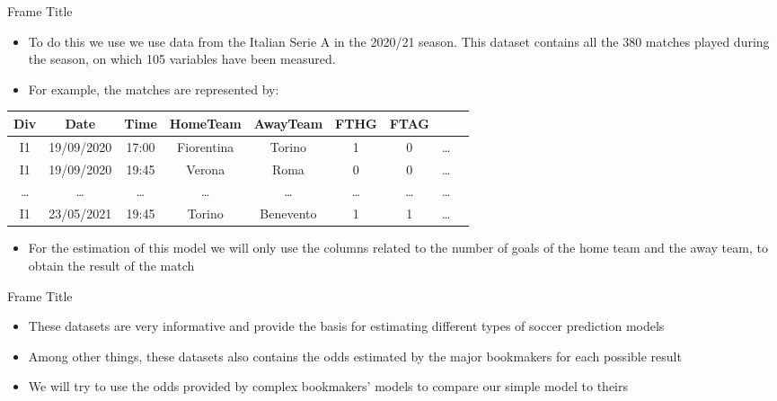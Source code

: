 \documentclass[aspectratio=169,xcolor=dvipsnames]{beamer}
\begin{document}

\begin{frame}{Frame Title}
\begin{itemize}

    \item To do this we use we use data from the Italian Serie A in the 2020/21 season. This dataset contains all the 380 matches played during the season, on which 105 variables have been measured. 
    
    \item For example, the matches are represented by:
\end{itemize}

    \begin{table}[ht]
    \centering
    \begin{tabular}{ccccccccc}
      \hline
      Div & Date & Time & HomeTeam & AwayTeam & FTHG & FTAG & \\ 
      \hline
      I1 & 19/09/2020 & 17:00 & Fiorentina & Torino &   1 &  0 & \dots \\ 
      I1 & 19/09/2020 & 19:45 & Verona & Roma &   0 &   0 & \dots \\ 
      \dots & \dots & \dots  & \dots & \dots & \dots & \dots & \dots \\ 
      I1 & 23/05/2021 & 19:45 & Torino & Benevento &   1 &   1 & \dots \\ 
       \hline
    \end{tabular}
    \end{table}

\begin{itemize}
    
    \item For the estimation of this model we will only use the columns related to the number of goals of the home team and the away team, to obtain the result of the match
\end{itemize}
    
\end{frame}

\begin{frame}{Frame Title}
\begin{itemize}

    \item These datasets are very informative and provide the basis for estimating different types of soccer prediction models
    
    \item Among other things, these datasets also contains the odds estimated by the major bookmakers for each possible result
    
    \item We will try to use the odds provided by complex bookmakers' models to compare our simple model to theirs
\end{itemize}
\end{frame}
\end{document}
